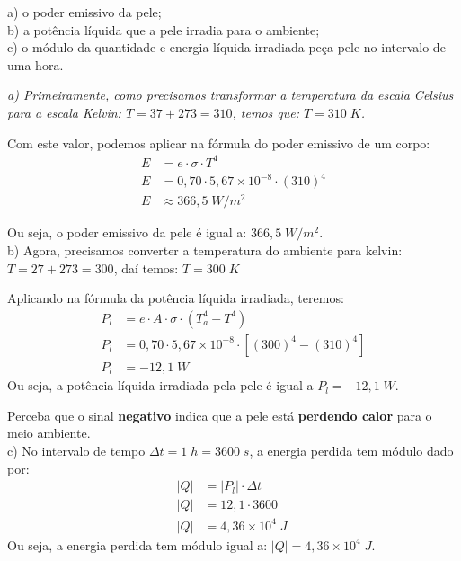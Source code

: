 \documentclass[12pt,twoside]{article}
\newenvironment{resposta*}
{\bf Resposta:\\ }
{}
\begin{document}
a) o poder emissivo da pele; \\
b) a potência líquida que a pele irradia para o ambiente; \\
c) o módulo da quantidade e energia líquida irradiada peça pele no intervalo de uma hora.


\begin{resposta*}
{\it a) Primeiramente, como precisamos transformar a temperatura da escala Celsius para a escala Kelvin: $T=37+273=310$, temos que: $T=310\;K$.

Com este valor, podemos aplicar na fórmula do poder emissivo de um corpo:
\begin{align*}
E &= e\cdot \sigma \cdot T^{4} \\
E &= 0,70\cdot 5,67\times 10^{-8}\cdot (310)^{4} \\
E &\approx 366,5\;W/m^{2}
\end{align*}

Ou seja, o poder emissivo da pele é igual a: $\boxed{366,5\;W/m^{2}}$. \\

b) Agora, precisamos converter a temperatura do ambiente para kelvin: $T=27+273=300$, daí temos: $T=300\;K$

Aplicando na fórmula da potência líquida irradiada, teremos:
\begin{align*}
P_{l} &= e \cdot A \cdot \sigma \cdot (T_{a}^{4} - T^{4}) \\
P_{l} &= 0,70\cdot 5,67\times 10^{-8}\cdot [(300)^{4} - (310)^{4}] \\
P_{l} &= -12,1\;W
\end{align*}
Ou seja, a potência líquida irradiada pela pele é igual a $\boxed{P_{l}=-12,1\;W}$.

Perceba que o sinal \textbf{negativo} indica que a pele está \textbf{perdendo calor} para o meio ambiente. \\

c) No intervalo de tempo $\Delta t = 1\;h = 3600\;s$, a energia perdida tem módulo dado por:
\begin{align*}
|Q| &= |P_{l}| \cdot \Delta t \\
|Q| &= 12,1 \cdot 3600 \\
|Q| &= 4,36\times 10^{4}\;J\;
\end{align*}
Ou seja, a energia perdida tem módulo igual a: $\boxed{|Q|=4,36\times 10^{4}\;J}$.}
\end{resposta*}
\end{document}
